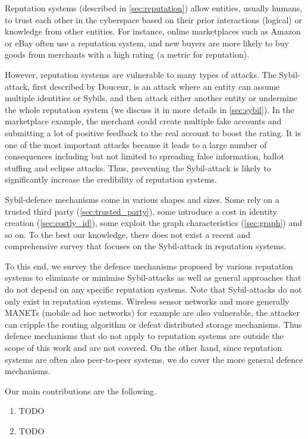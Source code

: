 Reputation systems (described in \autoref{sec:reputation}) allow entities,
usually humans, to trust each other in the cyberspace based on their prior
interactions (logical) or knowledge from other entities. For instance, online
marketplaces such as Amazon or eBay often use a reputation system, and new
buyers are more likely to buy goods from merchants with a high rating (a metric
for reputation).

However, reputation systems are vulnerable to many types of attacks. The
Sybil-attack, first described by Douceur\cite{douceur2002sybil}, is an attack
where an entity can assume multiple identities or Sybils, and then attack either
another entity or undermine the whole reputation system (we discuss it in more
details in \autoref{sec:sybil}). In the marketplace example, the merchant could
create multiple fake accounts and submitting a lot of positive feedback to the
real account to boost the rating. It is one of the most important attacks
because it leads to a large number of consequences including but not limited to
spreading false information, ballot stuffing\cite{bhattacharjee2005avoiding} and
eclipse attacks\cite{singh2006eclipse}. Thus, preventing the Sybil-attack is
likely to significantly increase the credibility of reputation systems.

Sybil-defence mechanisms come in various shapes and sizes. Some rely on a
trusted third party (\autoref{sec:trusted_party}), some introduce a cost in
identity creation (\autoref{sec:costly_id}), some exploit the graph
characteristics (\autoref{sec:graph}) and so on. To the best our knowledge,
there does not exist a recent and comprehensive survey that focuses on the
Sybil-attack in reputation systems.

To this end, we survey the defence mechanisms proposed by various reputation
systems to eliminate or minimise Sybil-attacks as well as general approaches
that do not depend on any specific reputation systems. Note that Sybil-attacks
do not only exist in reputation systems. Wireless sensor networks and more
generally MANETs (mobile ad hoc networks) for example are also vulnerable, the
attacker can cripple the routing algorithm or defeat distributed storage
mechanisms\cite{newsome2004sybil}. Thus defence mechanisms that do not apply to
reputation systems are outside the scope of this work and are not covered. On
the other hand, since reputation systems are often also peer-to-peer systems, we
do cover the more general defence mechanisms.

Our main contributions are the following.
\begin{enumerate}
  \item TODO
  \item TODO
\end{enumerate}

